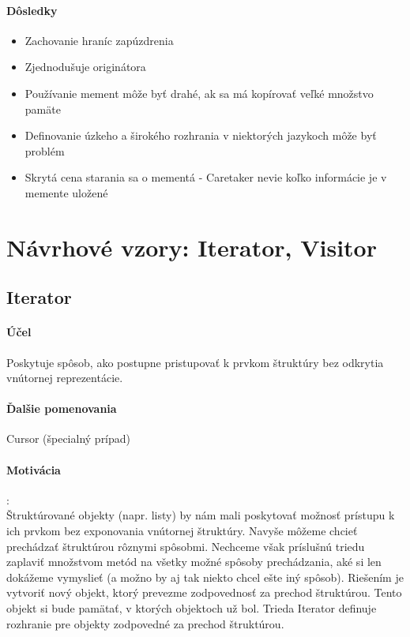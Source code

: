 		\paragraph{Dôsledky}
			\begin{itemize}
				\item Zachovanie hraníc zapúzdrenia
				\item Zjednodušuje originátora
				\item Používanie mement môže byť drahé, ak sa má kopírovať veľké množstvo pamäte
				\item Definovanie úzkeho a širokého rozhrania v niektorých jazykoch môže byť problém
				\item Skrytá cena starania sa o mementá - Caretaker nevie koľko informácie je v memente uložené
			\end{itemize}


\section{Návrhové vzory: Iterator, Visitor}

	\subsection{Iterator}
		\paragraph{Účel}
		Poskytuje spôsob, ako postupne pristupovať k prvkom štruktúry bez odkrytia vnútornej reprezentácie.
		\paragraph{Ďalšie pomenovania} Cursor (špecialný prípad)
		\paragraph{Motivácia}:\\
			Štruktúrované objekty (napr. listy) by nám mali poskytovať možnosť prístupu k ich prvkom bez exponovania vnútornej štruktúry. Navyše môžeme chcieť prechádzať štruktúrou rôznymi spôsobmi. Nechceme však príslušnú triedu zaplaviť množstvom metód na všetky možné spôsoby prechádzania, aké si len dokážeme vymyslieť (a možno by aj tak niekto chcel ešte iný spôsob). Riešením je vytvoriť nový objekt, ktorý prevezme zodpovednosť za prechod štruktúrou. Tento objekt si bude pamätať, v ktorých objektoch už bol. Trieda Iterator definuje rozhranie pre objekty zodpovedné za prechod štruktúrou.\\

